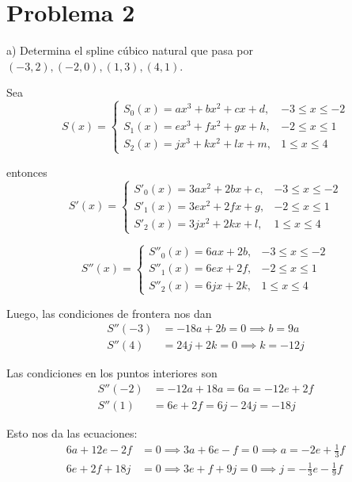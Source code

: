 \documentclass[a4paper,12pt]{article}
\begin{document}
\newpage

\section*{Problema 2}

a) Determina el spline cúbico natural que pasa por $(-3, 2), (-2, 0), (1, 3), (4, 1)$.

Sea
\[ S(x) = \begin{cases} S_0(x) = ax^3 + bx^2 + cx + d, & -3 \le x \le -2 \\ S_1(x) = ex^3 + fx^2 + gx + h, & -2 \le x \le 1 \\ S_2(x) = jx^3 + kx^2 + lx + m, & 1 \le x \le 4 \end{cases} \]

entonces
\[ S'(x) = \begin{cases} S'_0(x) = 3ax^2 + 2bx + c, & -3 \le x \le -2 \\ S'_1(x) = 3ex^2 + 2fx + g, & -2 \le x \le 1 \\ S'_2(x) = 3jx^2 + 2kx + l, & 1 \le x \le 4 \end{cases} \]

\[ S''(x) = \begin{cases} S''_0(x) = 6ax + 2b, & -3 \le x \le -2 \\ S''_1(x) = 6ex + 2f, & -2 \le x \le 1 \\ S''_2(x) = 6jx + 2k, & 1 \le x \le 4 \end{cases} \]

Luego, las condiciones de frontera nos dan
\begin{align*}
    S''(-3) &= -18a + 2b = 0 \implies b = 9a \\
    S''(4) &= 24j + 2k = 0 \implies k = -12j
\end{align*}

Las condiciones en los puntos interiores son
\begin{align*}
    S''(-2) &= -12a + 18a = 6a = -12e + 2f \\
    S''(1) &= 6e + 2f = 6j - 24j = -18j
\end{align*}

Esto nos da las ecuaciones:
\begin{align*}
    6a + 12e - 2f &= 0 \implies 3a + 6e - f = 0 \implies a = -2e + \frac{1}{3}f \\
    6e + 2f + 18j &= 0 \implies 3e + f + 9j = 0 \implies j = -\frac{1}{3}e - \frac{1}{9}f
\end{align*}

\newpage
\end{document}
